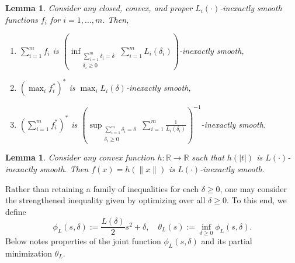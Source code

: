 \documentclass[11pt, hidelinks]{article}
\numberwithin{equation}{section}
\theoremstyle{thmstyletwo}%
\newtheorem{lemma}[thm]{Lemma}
\numberwithin{equation}{section}
\newcommand{\R}{\mathbb{R}}
\begin{document}
\begin{lemma}\label{lemma:L(delta) sums and max calculus}
    Consider any closed, convex, and proper $L_i(\cdot)$-inexactly smooth functions $f_i$ for $i=1,\dots,m$. Then, \begin{enumerate}
        \item $\sum_{i=1}^m f_i$ is $\left(\inf_{\substack{\sum_{i=1}^m \delta_i = \delta\\ \delta_i \geq 0}} \sum_{i=1}^m L_i(\delta_i)\right)$-inexactly smooth,
        \item $(\max_i f_i^*)^*$ is $\max_i L_i(\delta)$-inexactly smooth,
        \item $\left(\sum_{i=1}^m f_i^*\right)^*$ is $\left(\sup_{\substack{\sum_{i=1}^m \delta_i = \delta\\ \delta_i \geq 0}} \sum_{i=1}^m \frac{1}{L_i(\delta_i)}\right)^{-1}$-inexactly smooth.
    \end{enumerate}
\end{lemma}



\begin{lemma}\label{composing with abs to norm}
    Consider any convex function $h : \R \to \R $ such that $h(|t|)$ is $L(\cdot)$-inexactly smooth. Then $f(x) = h(\|x\|)$ is $L(\cdot)$-inexactly smooth.  
\end{lemma}

Rather than retaining a family of inequalities for each $\delta\geq 0$, one may consider the strengthened inequality given by optimizing over all $\delta\geq 0$. To this end, we define
\begin{equation}\label{def:theta}
    \phi_L(s,\delta) := \frac{L(\delta)}{2}s^2 + \delta, \quad \theta_L(s
    ) := \inf_{\delta \geq 0} \phi_L(s,\delta).
\end{equation}
Below notes properties of the joint function $\phi_L(s,\delta)$ and its partial minimization $\theta_L$. 
\end{document}
